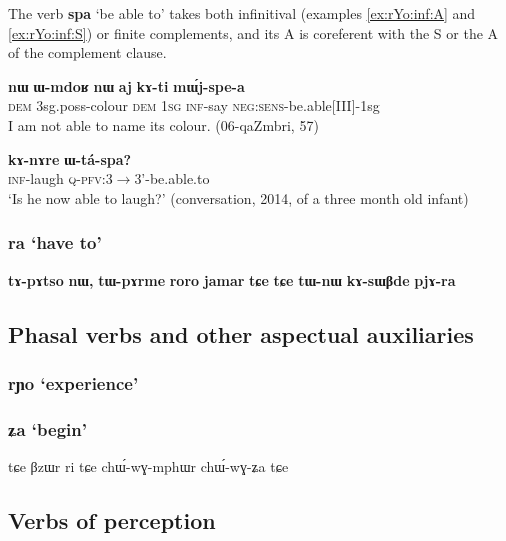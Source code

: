 \documentclass[oldfontcommands,oneside,a4paper,11pt]{article}
\newcommand{\ipa}[1]{\textbf{\phon#1}} %
\newcommand{\jpg}[2]{\ipa{#1} `#2'} %
\begin{document}
The verb \jpg{spa}{be able to} takes both infinitival (examples \ref{ex:rYo:inf:A} and \ref{ex:rYo:inf:S}) or finite complements, and its A is coreferent with the S or the A of the complement clause.

\begin{exe}
\ex  \label{ex:rYo:inf:A}
\gll
\ipa{nɯ} 	\ipa{ɯ-mdoʁ} 	\ipa{nɯ} 	\ipa{aj} 	\ipa{kɤ-ti} 	\ipa{mɯ́j-spe-a} \\
\textsc{dem} 3sg.poss-colour \textsc{dem} \textsc{1sg} \textsc{inf}-say \textsc{neg:sens}-be.able[III]-1sg \\
\glt I am not able to name its colour. (06-qaZmbri, 57)
\end{exe}

\begin{exe}
\ex  \label{ex:rYo:inf:S}
\gll 
 \ipa{kɤ-nɤre} 	\ipa{ɯ-tá-spa?}\\
 \textsc{inf}-laugh \textsc{q-pfv}:3$\rightarrow$3'-be.able.to\\
 \glt `Is he now able to laugh?' (conversation, 2014, of a three month old infant)
\end{exe}
    
  \subsubsection{\jpg{ra}{have to}} \label{sec:ra}
  \ipa{tɤ-pɤtso} 	\ipa{nɯ,} 	\ipa{tɯ-pɤrme} 	\ipa{roro} 	\ipa{jamar} 	\ipa{tɕe} 	\ipa{tɕe} 	\ipa{tɯ-nɯ} 	\ipa{kɤ-sɯβde} 	\ipa{pjɤ-ra} 
  
  \subsection{Phasal verbs and other aspectual auxiliaries}
\subsubsection{\jpg{rɲo}{experience}}   \label{sec:rɲo}
\subsubsection{\jpg{ʑa}{begin}}   \label{sec:Za}

tɕe βzɯr ri tɕe chɯ́-wɣ-mphɯr chɯ́-wɣ-ʑa tɕe


   \subsection{Verbs of perception}
  
\end{document}
